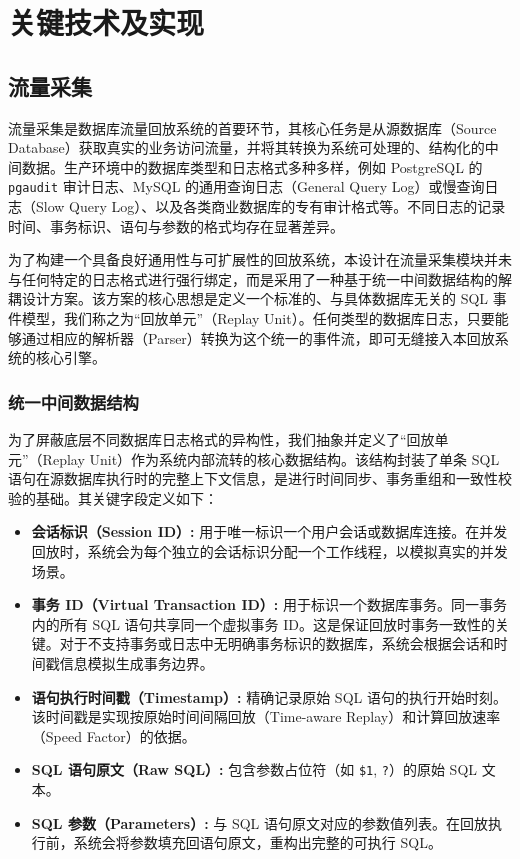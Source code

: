 \newpage
\setcounter{table}{0}
\setcounter{figure}{0}
\section{关键技术及实现}
\subsection{流量采集}
流量采集是数据库流量回放系统的首要环节，其核心任务是从源数据库（Source Database）获取真实的业务访问流量，并将其转换为系统可处理的、结构化的中间数据。生产环境中的数据库类型和日志格式多种多样，例如 PostgreSQL 的 \texttt{pgaudit} 审计日志、MySQL 的通用查询日志（General Query Log）或慢查询日志（Slow Query Log）、以及各类商业数据库的专有审计格式等。不同日志的记录时间、事务标识、语句与参数的格式均存在显著差异。

为了构建一个具备良好通用性与可扩展性的回放系统，本设计在流量采集模块并未与任何特定的日志格式进行强行绑定，而是采用了一种基于统一中间数据结构的解耦设计方案。该方案的核心思想是定义一个标准的、与具体数据库无关的 SQL 事件模型，我们称之为“回放单元”（Replay Unit）。任何类型的数据库日志，只要能够通过相应的解析器（Parser）转换为这个统一的事件流，即可无缝接入本回放系统的核心引擎。

\subsubsection{统一中间数据结构}
为了屏蔽底层不同数据库日志格式的异构性，我们抽象并定义了“回放单元”（Replay Unit）作为系统内部流转的核心数据结构。该结构封装了单条 SQL 语句在源数据库执行时的完整上下文信息，是进行时间同步、事务重组和一致性校验的基础。其关键字段定义如下：
\begin{itemize}
    \item \textbf{会话标识（Session ID）:} 用于唯一标识一个用户会话或数据库连接。在并发回放时，系统会为每个独立的会话标识分配一个工作线程，以模拟真实的并发场景。
    \item \textbf{事务 ID（Virtual Transaction ID）:} 用于标识一个数据库事务。同一事务内的所有 SQL 语句共享同一个虚拟事务 ID。这是保证回放时事务一致性的关键。对于不支持事务或日志中无明确事务标识的数据库，系统会根据会话和时间戳信息模拟生成事务边界。
    \item \textbf{语句执行时间戳（Timestamp）:} 精确记录原始 SQL 语句的执行开始时刻。该时间戳是实现按原始时间间隔回放（Time-aware Replay）和计算回放速率（Speed Factor）的依据。
    \item \textbf{SQL 语句原文（Raw SQL）:} 包含参数占位符（如 \texttt{\$1}, \texttt{?}）的原始 SQL 文本。
    \item \textbf{SQL 参数（Parameters）:} 与 SQL 语句原文对应的参数值列表。在回放执行前，系统会将参数填充回语句原文，重构出完整的可执行 SQL。
\end{itemize}

